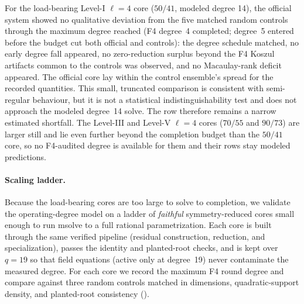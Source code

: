 \documentclass[11pt]{article}
\begin{document}
For the load-bearing Level-I $\ell=4$ core ($50/41$, modeled degree 14), the
official system showed no qualitative deviation from the five matched random
controls through the maximum degree reached (F4 degree~4 completed; degree~5
entered before the budget cut both official and controls): the degree schedule
matched, no early degree fall appeared, no zero-reduction surplus beyond the F4
Koszul artifacts common to the controls was observed, and no Macaulay-rank
deficit appeared.  The official core lay within the control ensemble's spread
for the recorded quantities.  This small, truncated comparison is consistent
with semi-regular behaviour, but it is not a statistical indistinguishability
test and does not approach the modeled degree~14 solve.  The row therefore
remains a narrow estimated shortfall.  The Level-III and Level-V $\ell=4$ cores
($70/55$ and $90/73$) are larger still and lie even further beyond the
completion budget than the $50/41$ core, so no F4-audited degree is available
for them and their rows stay modeled predictions.

\paragraph{Scaling ladder.}
Because the load-bearing cores are too large to solve to completion, we validate
the operating-degree model on a ladder of \emph{faithful} symmetry-reduced cores
small enough to run msolve to a full rational parametrization.  Each core is built
through the same verified pipeline (residual construction, reduction, and
specialization), passes the identity and planted-root checks, and is kept over
$q=19$ so that field equations (active only at degree~19) never contaminate the
measured degree.  For each core we record the maximum F4 round degree and compare
against three random controls matched in dimensions, quadratic-support density,
and planted-root consistency ().
\end{document}
